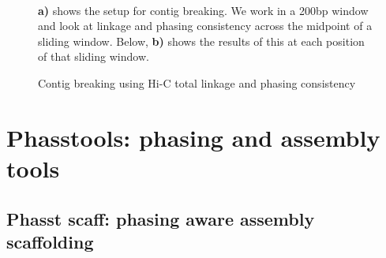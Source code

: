 {\begin{figure}[htbp!]
\caption{Contig breaking using Hi-C total linkage and phasing consistency}
\label{figure:contigbreaking}
\begin{centering}
 \\
\par{\textbf{a)} shows the setup for contig breaking. We work in a 200bp window and look at linkage and phasing consistency across the midpoint of a sliding window. Below, \textbf{b)} shows the results of this at each position of that sliding window. }
\end{centering}
\end{figure}



\section{Phasstools: phasing and assembly tools}

\subsection{Phasst scaff: phasing aware assembly scaffolding}

}
